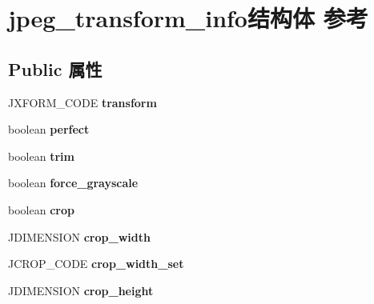 \hypertarget{structjpeg__transform__info}{}\section{jpeg\+\_\+transform\+\_\+info结构体 参考}
\label{structjpeg__transform__info}
\subsection*{Public 属性}
\begin{DoxyCompactItemize}
\item 
\mbox{\label{structjpeg__transform__info_aa3227394d9b01bae8543faf79e9c5fe8}} 
J\+X\+F\+O\+R\+M\+\_\+\+C\+O\+DE {\bfseries transform}
\item 
\mbox{\label{structjpeg__transform__info_a6cefe762b48d689b0b805dd5c3be75fd}} 
boolean {\bfseries perfect}
\item 
\mbox{\label{structjpeg__transform__info_a4f1f979322463d2c02a307047f0cf6b7}} 
boolean {\bfseries trim}
\item 
\mbox{\label{structjpeg__transform__info_a26d925edb18e0095056b38312fb86e53}} 
boolean {\bfseries force\+\_\+grayscale}
\item 
\mbox{\label{structjpeg__transform__info_a9c2edc10e30220708a48c93422841dc4}} 
boolean {\bfseries crop}
\item 
\mbox{\label{structjpeg__transform__info_aa7669467cf9562283cfc92df23798035}} 
J\+D\+I\+M\+E\+N\+S\+I\+ON {\bfseries crop\+\_\+width}
\item 
\mbox{\label{structjpeg__transform__info_a8f5206aab70a3ff0b0acc94cb8692b4c}} 
J\+C\+R\+O\+P\+\_\+\+C\+O\+DE {\bfseries crop\+\_\+width\+\_\+set}
\item 
\mbox{\label{structjpeg__transform__info_a0ed85b4df9f3feaeff5cf31252b0a0dd}} 
J\+D\+I\+M\+E\+N\+S\+I\+ON {\bfseries crop\+\_\+height}
\item 

\end{DoxyCompactItemize}

